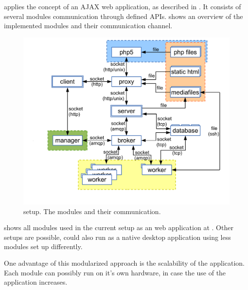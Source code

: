 

\spl applies the concept of an AJAX web application, as described in .
It consists of several modules communication through defined APIs.
 shows an overview of the implemented modules and their communication channel.

\begin{figure}[htbp]
  \centering
    \includegraphics[width=\textwidth]{fig/whole_setup.pdf}
  \caption{\spl setup. The modules and their communication.}
  \label{fig:whole_setup}
\end{figure}


 shows all modules used in the current setup as an web application at \splurl.
Other setups are possible, \spl could also run as a native desktop application using less modules set up differently.

One advantage of this modularized approach is the scalability of the application.
Each module can possibly run on it's own hardware, in case the use of the application increases.

